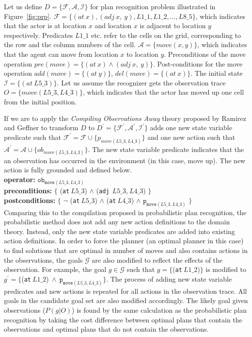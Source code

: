Let us define $D = \lbrace \mathcal{F}, \mathcal{A},\mathcal{I} \rbrace$ for plan recognition problem illustrated in Figure~\ref{fig:prp}. $\mathcal{F}= \lbrace (at\:x), (adj\:x,\:y), L1\_1, L1\_2, \ldots, L8\_5\rbrace$, which indicates that the actor is at location $x$ and location $x$ is adjacent to location $y$ respectively. Predicates $L1\_1$ etc. refer to the cells on the grid, corresponding to the row and the column numbers of the cell. $\mathcal{A}= \lbrace move(x,y)\rbrace$, which indicates that the agent can move from location $x$ to location $y$. Preconditions of the move operation $pre(move)=\lbrace (at\:x)  \land  (adj\:x,\:y) \rbrace$. Post-conditions for the move operation $add(move)=\lbrace (at\:y) \rbrace$, $del(move)=\lbrace (at\:x) \rbrace$. The initial state $\mathcal{I}=\lbrace (at\:L5\_3)\rbrace$. Let us assume the recognizer gets the observation trace $O=\lbrace move(L5\_3, L4\_3)\rbrace$, which indicates that the actor has moved up one cell from the initial position.

If we are to apply the \textit{Compiling Observations Away} theory proposed by Ramirez and Geffner to transform $D$ to $D^\prime=\lbrace \mathcal{F}^\prime, \mathcal{A}^\prime,\mathcal{I}^\prime\rbrace$ adds one new state variable predicate such that $\mathcal{F}^\prime=\mathcal{F}\cup\lbrace p_{move(L5\_3, L4\_3)}\rbrace$ and one new action such that $\mathcal{A}^\prime=\mathcal{A}\cup\lbrace ob_{move(L5\_3, L4\_3)}\rbrace$. The new state variable predicate indicates that the an observation has occurred in the environment (in this case, move up). The new action is fully grounded and defined below.\\
\textbf{operator:} $\texttt{ob}_{\texttt{move}(L5\_3, L4\_3)}$\\
\textbf{preconditions:} $\lbrace$ (\texttt{at}$\:L5\_3$) $\land$  (\texttt{adj}$\:\:L5\_3$,$\:L4\_3$) $\rbrace$ \\
\textbf{postconditions:} $\lbrace$ $\neg$ (\texttt{at}$\:L5\_3$) $\land $ (\texttt{at}$\:L4\_3$) $\land$ $\texttt{p}_{\texttt{move}(L5\_3, L4\_3)}$ $\rbrace$\\
Comparing this to the compilation proposed in probabilistic plan recognition, the probabilistic method does not add any new action definitions to the domain theory. Instead, only the new state variable predicates are added into existing action definitions. In order to force the planner (an optimal planner in this case) to find solutions that are optimal in number of moves and also contains actions in the observations, the goals $\mathcal{G}$ are also modified to reflect the effects of the observation. For example, the goal $g \in \mathcal{G}$ such that $g=\lbrace$(\texttt{at}$\:L1\_2$)$\rbrace$ is modified to  $g^\prime=\lbrace$(\texttt{at}$\:L1\_2$)$ \:\land\: \texttt{p}_{\texttt{move}(L5\_3, L4\_3)}\rbrace$. The process of adding new state variable predicates and new actions is repeated for all actions in the observation trace. All goals in the candidate goal set are also modified accordingly. The likely goal given observations ($P(g|O)$) is found by the same calculation as the probabilistic plan recognition by taking the cost difference between optimal plans that contain the observations and optimal plans that do not contain the observations.


